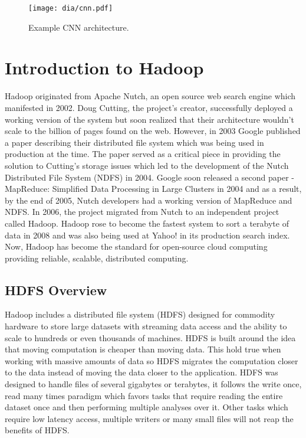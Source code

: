 \documentclass[12pt]{report}
\begin{document}
\begin{figure}[H]
\centering
\texttt{[image: dia/cnn.pdf]}
\caption[CNN architecture] {Example CNN architecture.}
\end{figure}


\chapter{Introduction to Hadoop}
Hadoop \cite{Hadoop} originated from Apache Nutch, an open source web search engine which manifested in 2002. Doug Cutting, the project's creator, successfully deployed a working version of the system but soon realized that their architecture wouldn't scale to the billion of pages found on the web. However, in 2003 Google published a paper describing their distributed file system which was being used in production at the time. The paper served as a critical piece in providing the solution to Cutting's storage issues which led to the development of the Nutch Distributed File System (NDFS) in 2004.  Google soon released a second paper - MapReduce: Simplified Data Processing in Large Clusters in 2004 and as a result,  by the end of 2005, Nutch developers had a working version of MapReduce and NDFS. In 2006, the project migrated from Nutch to an independent project called Hadoop. Hadoop rose to become the fastest system to sort a terabyte of data in 2008 and was also being used at Yahoo! in its production search index. Now, Hadoop has become the standard for open-source cloud computing providing reliable, scalable, distributed computing.

\section{HDFS Overview}
Hadoop includes a distributed file system (HDFS) designed for commodity hardware to store large datasets with streaming data access and the ability to scale to hundreds or even thousands of machines. HDFS is built around the idea that moving computation is cheaper than moving data. This hold true when working with massive amounts of data so HDFS migrates the computation closer to the data instead of moving the data closer to the application. HDFS was designed to handle files of several gigabytes or terabytes, it follows the write once, read many times paradigm which favors tasks that require reading the entire dataset once and then performing multiple analyses over it. Other tasks which require low latency access, multiple writers or many small files will not reap the benefits of HDFS. 
\end{document}
